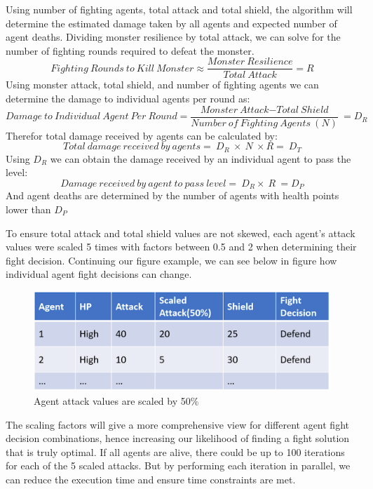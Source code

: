 \noindent Using number of fighting agents, total attack and total shield, the algorithm will determine the estimated damage taken by all agents and expected number of agent deaths. Dividing monster resilience by total attack, we can solve for the number of fighting rounds required to defeat the monster. 
\[Fighting\ Rounds\ to\ Kill\ Monster\approx \frac{Monster\ Resilience}{Total\ Attack}=R\] 
Using monster attack, total shield, and number of fighting agents we can determine the damage to individual agents per round as:
\[Damage\ to\ Individual\ Agent\ Per\ Round=\frac{Monster\ Attack\mathrm{-}Total\ Shield}{Number\ of\ Fighting\ Agents\ (N)}\ =D_R\] 
Therefor total damage received by agents can be calculated by:
\[Total\ damage\ received\ by\ agents=\ D_R\ \times \ N\ \times R=\ D_T\] 
Using $D_R$ we can obtain the damage received by an individual agent to pass the level:
\[Damage\ received\ by\ agent\ to\ pass\ level=\ D_R\times \ R\ =D_P\] 
And agent deaths are determined by the number of agents with health points lower than $D_P$

\noindent To ensure total attack and total shield values are not skewed, each agent's attack values were scaled 5 times with factors between 0.5 and 2 when determining their fight decision. Continuing our figure example, we can see below in figure how individual agent fight decisions can change.
\begin{figure}[htb]
    \centering
    \includegraphics[width=1\textwidth]{008_team_5_agent_design/images/scaled-attack.PNG}
    \caption{Agent attack values are scaled by 50\%}
    \label{scaledattack}
\end{figure}

\noindent The scaling factors will give a more comprehensive view for different agent fight decision combinations, hence increasing our likelihood of finding a fight solution that is truly optimal. If all agents are alive, there could be up to 100 iterations for each of the 5 scaled attacks. But by performing each iteration in parallel, we can reduce the execution time and ensure time constraints are met.

